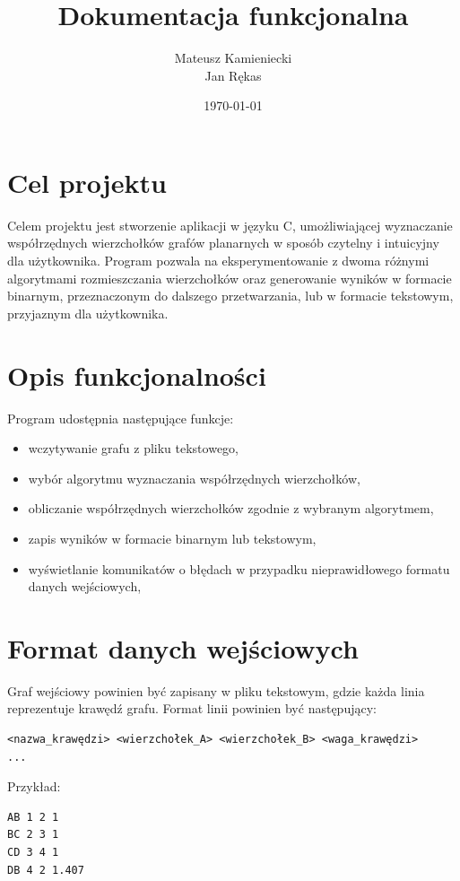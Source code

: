 \documentclass[12pt]{article}
\title{Dokumentacja funkcjonalna}
\author{Mateusz Kamieniecki \\ Jan Rękas}
\date{\today}
\begin{document}
\maketitle

\section{Cel projektu}
Celem projektu jest stworzenie aplikacji w języku C, umożliwiającej wyznaczanie
współrzędnych wierzchołków grafów planarnych w sposób czytelny i intuicyjny dla
użytkownika. Program pozwala na eksperymentowanie z dwoma różnymi algorytmami
rozmieszczania wierzchołków oraz generowanie wyników w formacie binarnym,
przeznaczonym do dalszego przetwarzania, lub w formacie tekstowym, przyjaznym
dla użytkownika.

\section{Opis funkcjonalności}

Program udostępnia następujące funkcje:

\begin{itemize}
	\item wczytywanie grafu z pliku tekstowego,
	\item wybór algorytmu wyznaczania współrzędnych wierzchołków,
	\item obliczanie współrzędnych wierzchołków zgodnie z wybranym algorytmem,
	\item zapis wyników w formacie binarnym lub tekstowym,
	\item wyświetlanie komunikatów o błędach w przypadku nieprawidłowego formatu danych wejściowych,
\end{itemize}

\section{Format danych wejściowych}

Graf wejściowy powinien być zapisany w pliku tekstowym, gdzie każda linia
reprezentuje krawędź grafu. Format linii powinien być następujący:

\begin{verbatim}
<nazwa_krawędzi> <wierzchołek_A> <wierzchołek_B> <waga_krawędzi>
...
\end{verbatim}

Przykład:
\begin{verbatim}
AB 1 2 1
BC 2 3 1
CD 3 4 1
DB 4 2 1.407
\end{verbatim}
\end{document}
